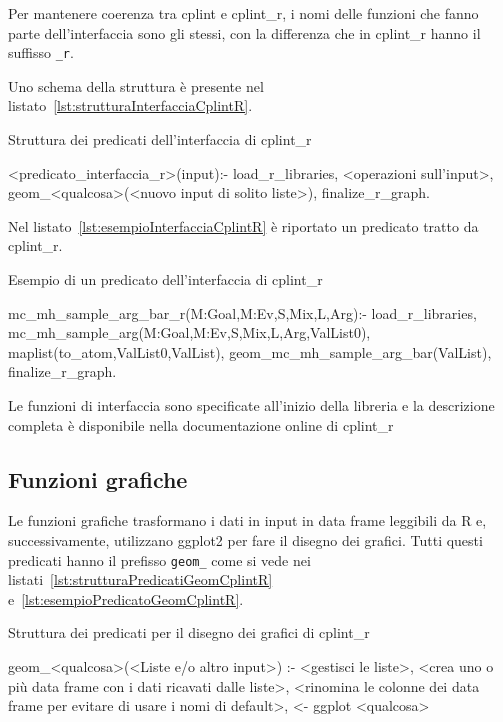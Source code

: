 \documentclass[10pt,titlepage,twoside,a4paper]{report}
\newenvironment{code}{\singlespacing\captionsetup{type=listing}}{}
\begin{document}
Per mantenere coerenza tra cplint e cplint\_r, i nomi delle funzioni che fanno 
parte dell'interfaccia sono gli stessi, con la differenza che in cplint\_r
hanno il suffisso \texttt{\_r}.

Uno schema della struttura è presente nel 
listato~\ref{lst:strutturaInterfacciaCplintR}.

\begin{code}
    \caption{Struttura dei predicati dell'interfaccia di cplint\_r}
    \label{lst:strutturaInterfacciaCplintR}
    \begin{prologcode*}{}
<predicato_interfaccia_r>(input):-
    load_r_libraries,
    <operazioni sull'input>,
    geom_<qualcosa>(<nuovo input di solito liste>),
    finalize_r_graph.
    \end{prologcode*}
\end{code}

Nel listato~\ref{lst:esempioInterfacciaCplintR} è riportato un predicato
tratto da cplint\_r.

\begin{code}
    \caption{Esempio di un predicato dell'interfaccia di cplint\_r}
    \label{lst:esempioInterfacciaCplintR}
    \begin{prologcode*}{}
mc_mh_sample_arg_bar_r(M:Goal,M:Ev,S,Mix,L,Arg):-
    load_r_libraries,
    mc_mh_sample_arg(M:Goal,M:Ev,S,Mix,L,Arg,ValList0),
    maplist(to_atom,ValList0,ValList),
    geom_mc_mh_sample_arg_bar(ValList),
    finalize_r_graph.
    \end{prologcode*}
\end{code}

Le funzioni di interfaccia sono specificate all'inizio della libreria e la 
descrizione completa è disponibile nella documentazione online di 
cplint\_r~\cite{cplintRInterface}

\subsection{Funzioni grafiche}
Le funzioni grafiche trasformano i dati in input in data frame leggibili da R 
e, successivamente, utilizzano ggplot2 per fare il disegno dei grafici. Tutti
questi predicati hanno il prefisso \texttt{geom\_} come si vede nei 
listati~\ref{lst:strutturaPredicatiGeomCplintR}
e~\ref{lst:esempioPredicatoGeomCplintR}.

\begin{code}
    \caption{Struttura dei predicati per il disegno dei grafici di cplint\_r}
    \label{lst:strutturaPredicatiGeomCplintR}
    \begin{prologcode*}{}
geom_<qualcosa>(<Liste e/o altro input>) :-
    <gestisci le liste>,
    <crea uno o più data frame con i dati ricavati dalle liste>,
    <rinomina le colonne dei data frame per evitare di usare i nomi di default>,
    <- ggplot <qualcosa>
    \end{prologcode*}
\end{code}
\end{document}
